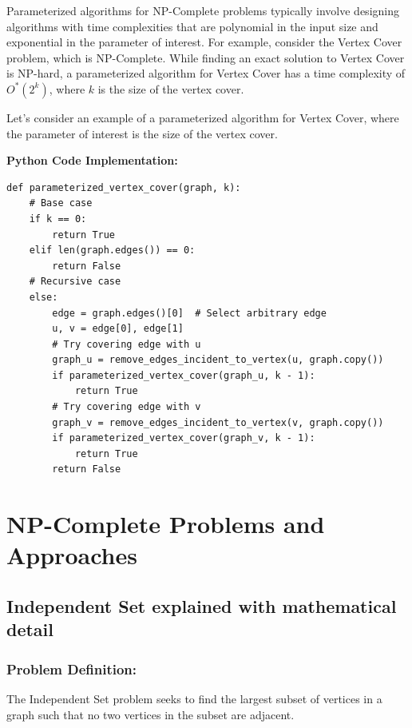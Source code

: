 Parameterized algorithms for NP-Complete problems typically involve designing algorithms with time complexities that are polynomial in the input size and exponential in the parameter of interest. For example, consider the Vertex Cover problem, which is NP-Complete. While finding an exact solution to Vertex Cover is NP-hard, a parameterized algorithm for Vertex Cover has a time complexity of \(O^*(2^k)\), where \(k\) is the size of the vertex cover.

Let's consider an example of a parameterized algorithm for Vertex Cover, where the parameter of interest is the size of the vertex cover.

\textbf{Python Code Implementation:}
\FloatBarrier
\begin{lstlisting}
def parameterized_vertex_cover(graph, k):
    # Base case
    if k == 0:
        return True
    elif len(graph.edges()) == 0:
        return False
    # Recursive case
    else:
        edge = graph.edges()[0]  # Select arbitrary edge
        u, v = edge[0], edge[1]
        # Try covering edge with u
        graph_u = remove_edges_incident_to_vertex(u, graph.copy())
        if parameterized_vertex_cover(graph_u, k - 1):
            return True
        # Try covering edge with v
        graph_v = remove_edges_incident_to_vertex(v, graph.copy())
        if parameterized_vertex_cover(graph_v, k - 1):
            return True
        return False
\end{lstlisting}
\FloatBarrier


\section{NP-Complete Problems and Approaches}

\subsection{Independent Set explained with mathematical detail}

\subsubsection{Problem Definition:} 
The Independent Set problem seeks to find the largest subset of vertices in a graph such that no two vertices in the subset are adjacent.


